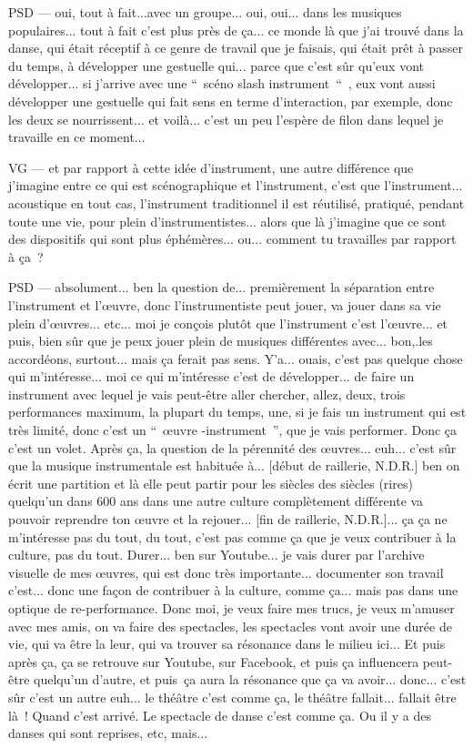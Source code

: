 PSD — oui, tout à fait...avec un groupe... oui, oui... dans les musiques populaires... tout à fait c'est plus près de ça... ce monde là que j'ai trouvé dans la danse, qui était réceptif à ce genre de travail que je faisais, qui était prêt à passer du temps, à développer une gestuelle qui... parce que c'est sûr qu'eux vont développer... si j'arrive avec une “ scéno slash instrument “ , eux vont aussi développer une gestuelle qui fait sens en terme d'interaction, par exemple, donc les deux se nourrissent... et voilà... c'est un peu l'espère de filon dans lequel je travaille en ce moment...

VG — et par rapport à cette idée d'instrument, une autre différence que j'imagine entre ce qui est scénographique et l'instrument, c'est que l'instrument... acoustique en tout cas, l'instrument traditionnel il est réutilisé, pratiqué, pendant toute une vie, pour plein d'instrumentistes... alors que là j'imagine que ce sont des dispositifs qui sont plus éphémères... ou... comment tu travailles par rapport à ça ?

PSD — absolument... ben la question de... premièrement la séparation entre l'instrument et l'œuvre, donc l'instrumentiste peut jouer, va jouer dans sa vie plein d'œuvres... etc...  moi je conçois plutôt que l'instrument c'est l'œuvre... et puis, bien sûr que je peux jouer plein de musiques différentes avec... bon,.les accordéons, surtout... mais ça ferait pas sens. Y'a... ouais, c'est pas quelque chose qui m'intéresse... moi ce qui m'intéresse c'est de développer... de faire un instrument avec lequel je vais peut-être aller chercher, allez, deux, trois performances maximum, la plupart du temps, une, si je fais un instrument qui est très limité, donc c'est un “ œuvre -instrument ”, que je vais performer. Donc ça c'est un volet. Après ça, la question de la pérennité des œuvres... euh... c'est sûr que la musique instrumentale est habituée à... [début de raillerie,  N.D.R.] ben on écrit une partition et là elle peut partir pour les siècles des siècles (rires)  quelqu'un dans 600 ans dans une autre culture complètement différente va pouvoir reprendre ton œuvre et la rejouer... [fin de raillerie,  N.D.R.]... ça ça ne m'intéresse pas du tout, du tout, c'est pas comme ça que je veux contribuer à la culture, pas du tout. Durer... ben sur Youtube... je vais durer par l'archive visuelle de mes œuvres, qui est donc très importante... documenter son travail c'est... donc une façon de contribuer à la culture, comme ça... mais pas dans une optique de re-performance. Donc moi, je veux faire mes trucs, je veux m'amuser avec mes amis, on va faire des spectacles, les spectacles vont avoir une durée de vie, qui va être la leur, qui va trouver sa résonance dans le milieu ici... Et puis après ça, ça se retrouve sur Youtube, sur Facebook, et puis ça influencera peut-être quelqu'un d'autre, et puis ça aura la résonance que ça va avoir... donc... c'est sûr c'est un autre euh... le théâtre c'est comme ça, le théâtre fallait... fallait être là ! Quand c'est arrivé. Le spectacle de danse c'est comme ça. Ou il y a des danses qui sont reprises, etc, mais...


